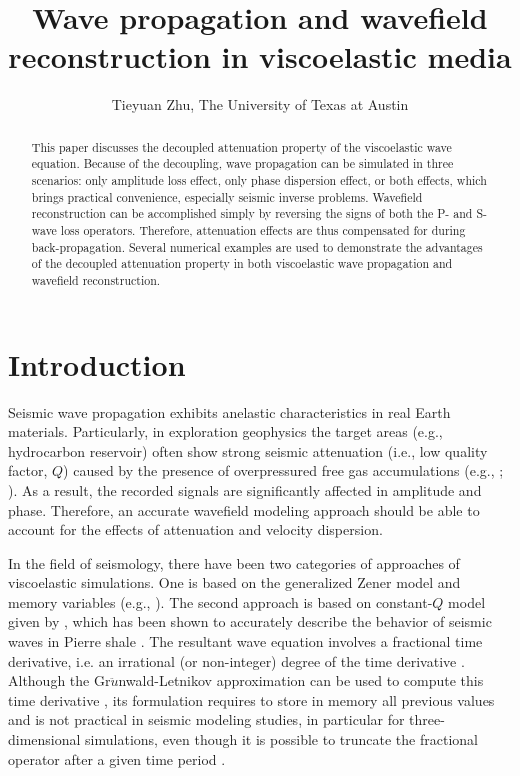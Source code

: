 
\title{Wave propagation and wavefield reconstruction in viscoelastic media}

\author{Tieyuan Zhu, The University of Texas at Austin}
\maketitle


\begin{abstract}
This paper discusses the decoupled attenuation property of the viscoelastic wave equation. Because of the decoupling, wave propagation can be simulated in three scenarios: only amplitude loss effect, only phase dispersion effect, or both effects, which brings practical convenience, especially seismic inverse problems. Wavefield reconstruction can be accomplished simply by reversing the signs of both the P- and S-wave loss operators. Therefore, attenuation effects are thus compensated for during back-propagation. Several numerical examples are used to demonstrate the advantages of the decoupled attenuation property in both viscoelastic wave propagation and wavefield reconstruction. 
\end{abstract}

\section{Introduction}
Seismic wave propagation exhibits anelastic characteristics in real Earth materials. Particularly, in exploration geophysics the target areas (e.g., hydrocarbon reservoir) often show strong seismic attenuation (i.e., low quality factor, $Q$) caused by the presence of overpressured free gas accumulations (e.g., \citealt{carcione2003}; \citealt{dvorkin2006}). As a result, the recorded signals are significantly affected in amplitude and phase. Therefore, an accurate wavefield modeling approach should be able to account for the effects of attenuation and velocity dispersion. 

In the field of seismology, there have been two categories of approaches of viscoelastic simulations. One is based on the generalized Zener model and memory variables (e.g., \citealt{carcione1988}). The second approach is based on constant-$Q$ model given by \citet[]{kja79}, which has been shown to accurately describe the behavior of seismic waves in Pierre shale \cite[]{McDonal1958}. The resultant wave equation involves a fractional time derivative, i.e. an irrational (or non-integer) degree of the time derivative \cite[]{Caputo1971}. Although the Gr$\ddot{u}$nwald-Letnikov approximation \cite[]{Podlubny1999} can be used to compute this time derivative \cite[]{carcione2002,carcione2009}, its formulation requires to store in memory all previous values and is not practical in seismic modeling studies, in particular for three-dimensional simulations, even though it is possible to truncate the fractional operator after a given time period \cite[]{carcione2002}.

